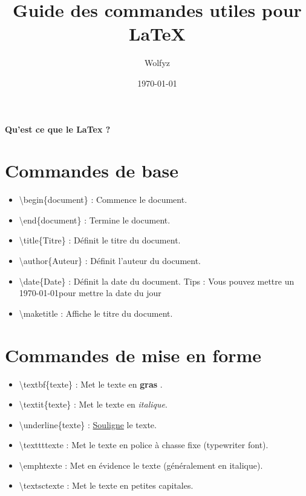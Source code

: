 \documentclass{article}
\title{Guide des commandes utiles pour LaTeX}
\author{Wolfyz}
\date{\today}
\begin{document}
\maketitle

\paragraph{Qu'est ce que le LaTex ? }

\section{Commandes de base}
\begin{itemize}
\item \textbackslash{}begin\{document\} : Commence le document.
\item \textbackslash{}end\{document\} : Termine le document.
\item \textbackslash{}title\{Titre\} : Définit le titre du document.
\item \textbackslash{}author\{Auteur\} : Définit l'auteur du document.
\item \textbackslash{}date\{Date\} : Définit la date du document.
Tips :  Vous pouvez mettre un \today pour mettre la date du jour 
\item \textbackslash{}maketitle : Affiche le titre du document.
\end{itemize}


\section{Commandes de mise en forme}
\begin{itemize}
\item \textbackslash{}textbf\{texte\} : Met le texte en \textbf{gras} .
\item \textbackslash{}textit\{texte\} : Met le texte en \textit{italique}.
\item \textbackslash{}underline\{texte\} : \underline{Souligne} le texte.
\item \textbackslash{}texttt{texte} : Met le texte en police à chasse fixe (typewriter font).
\item \textbackslash{}emph{texte} : Met en évidence le texte (généralement en italique).
\item \textbackslash{}textsc{texte} : Met le texte en petites capitales.
\end{itemize}
\end{document}
